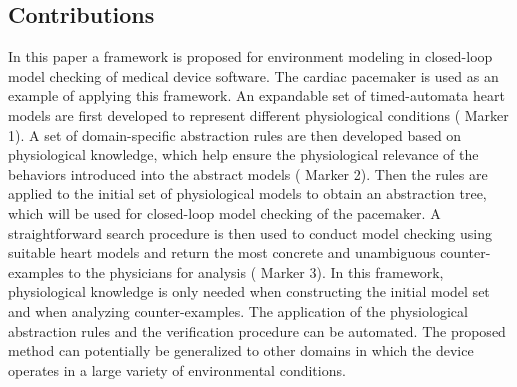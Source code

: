 \subsection{Contributions}
In this paper a framework is proposed for environment modeling in closed-loop model checking of medical device software.
The cardiac pacemaker is used as an example of applying this framework.
An expandable set of timed-automata heart models are first developed to represent different physiological conditions ( Marker 1).
A set of domain-specific abstraction rules are then developed based on physiological knowledge, which help ensure the physiological relevance of the behaviors introduced into the abstract models ( Marker 2).
Then the rules are applied to the initial set of physiological models to obtain an abstraction tree, which will be used for closed-loop model checking of the pacemaker. 
A straightforward search procedure is then used to conduct model checking using suitable heart models and return the most concrete and unambiguous counter-examples to the physicians for analysis ( Marker 3).
In this framework, physiological knowledge is only needed when constructing the initial model set and when analyzing counter-examples. 
The application of the physiological abstraction rules and the verification procedure can be automated.
The proposed method can potentially be generalized to other domains in which the device operates in a large variety of environmental conditions.

